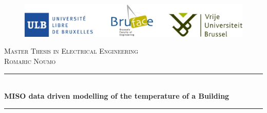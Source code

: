 \documentclass[a4paper,12pt]{article}
\numberwithin{equation}{section}
\begin{document}
\begin{titlepage}

\newcommand{\HRule}{\rule{\linewidth}{0.5mm}} %

\center %
 

\begin{figure}[h]
    \includegraphics[scale=0.5]{logos_bruface.pdf}\\[1cm] 
\end{figure}

\vspace{1cm}
\vspace{0.5cm}
\textsc{\large Master Thesis in Electrical Engineering}\\[0.5cm] %
\textsc{\large Romaric Noumo}\\[0.5cm]


\HRule \\[0.5cm]
{ \huge \bfseries MISO data driven modelling of the temperature of a Building}\\[0.4cm] %
\HRule \\[1.5cm]
 



\end{titlepage}
\end{document}
